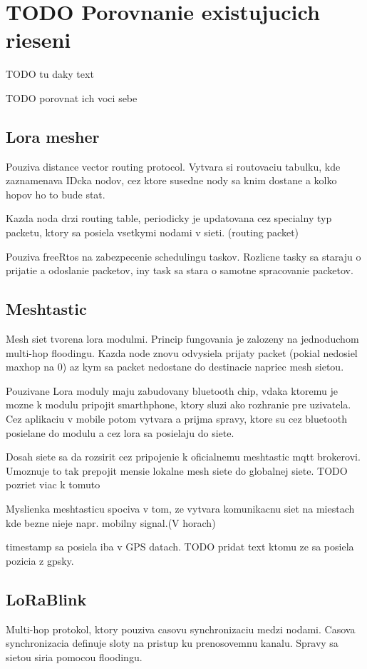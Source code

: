 \documentclass[slovak,master]{diploma}
\begin{document}
\chapter{TODO Porovnanie existujucich rieseni}
TODO tu daky text

TODO porovnat ich voci sebe

\section{Lora mesher}
Pouziva distance vector routing protocol.
Vytvara si routovaciu tabulku, kde zaznamenava IDcka nodov, cez ktore susedne nody sa knim dostane a kolko hopov ho to bude stat.

Kazda noda drzi routing table, periodicky je updatovana cez specialny typ packetu, ktory sa posiela vsetkymi nodami v sieti. (routing packet)

Pouziva freeRtos na zabezpecenie schedulingu taskov. Rozlicne tasky sa staraju o prijatie a odoslanie packetov, iny task sa stara o samotne spracovanie packetov.

\section{Meshtastic}
Mesh siet tvorena lora modulmi. Princip fungovania je zalozeny na jednoduchom multi-hop floodingu.
Kazda node znovu odvysiela prijaty packet (pokial nedosiel maxhop na 0) az kym sa packet nedostane do destinacie napriec mesh sietou.

Pouzivane Lora moduly maju zabudovany bluetooth chip, vdaka ktoremu je mozne k modulu pripojit smarthphone, ktory sluzi ako rozhranie pre
 uzivatela. Cez aplikaciu v mobile potom vytvara a prijma spravy, ktore su cez bluetooth posielane do modulu a cez lora sa posielaju do siete.

Dosah siete sa da rozsirit cez pripojenie k oficialnemu meshtastic mqtt brokerovi. Umoznuje to tak prepojit mensie lokalne mesh siete do globalnej siete. TODO pozriet viac k tomuto

Myslienka meshtasticu spociva v tom, ze vytvara komunikacnu siet na miestach kde bezne nieje napr. mobilny signal.(V horach)

timestamp sa posiela iba v GPS datach. TODO pridat text ktomu ze sa posiela pozicia z gpsky.

\section{LoRaBlink}
Multi-hop protokol, ktory pouziva casovu synchronizaciu medzi nodami. Casova synchronizacia definuje sloty na pristup ku prenosovemnu kanalu.
Spravy sa sietou siria pomocou floodingu.
\end{document}
